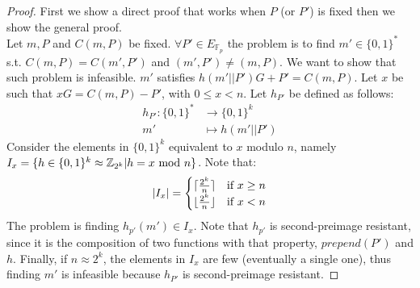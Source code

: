 \begin{proof}
	First we show a direct proof that works when $P$ (or $P'$) is fixed then we show the general proof.
	\\
	Let $m,P$ and $C(m,P)$ be fixed.
	$\forall P' \in E_{\mathbb{F}_p}$ the problem is to find $m' \in \{0,1\}^*$ s.t. $C(m,P)=C(m',P')$ and $(m', P') \neq (m, P)$. 
	We want to show that such problem is infeasible.
	$m'$ satisfies $h(m'||P')G + P'=C(m,P)$.
	Let $x$ be such that $xG = C(m,P) - P'$, with $0\leq x<n$. 
	Let $h_{P'}$ be defined as follows:
	\begin{equation*}
	\begin{split}
	h_{P'}:\{0,1\}^* & \rightarrow \{0,1\}^k\\
	m' & \mapsto h(m'||P')
	\end{split}
	\end{equation*}
	Consider the elements in $\{0,1\}^{k}$ equivalent to $x$ modulo $n$, namely $I_x=\{h \in \{0,1\}^k \approx \mathbb{Z}_{2^k} | h=x\textmd{ mod }n\}$.
	Note that:
	\begin{equation*}
		|I_x|=\begin{cases}
				\lceil\frac{2^k}{n}\rceil & \textmd{if } x\geq n \\
				\lfloor\frac{2^k}{n}\rfloor & \textmd{if } x< n
		      \end{cases}
	\end{equation*}
	The problem is finding $h_{p'}(m')\in I_x$.
	Note that $h_{p'}$ is second-preimage resistant, since it is the composition of two functions with that property, $prepend(P')$ and $h$.
	Finally, if $n \approx 2^k$, the elements in $I_x$ are few (eventually a single one), thus finding $m'$ is infeasible because $h_{P'}$ is second-preimage resistant.

\end{proof}

